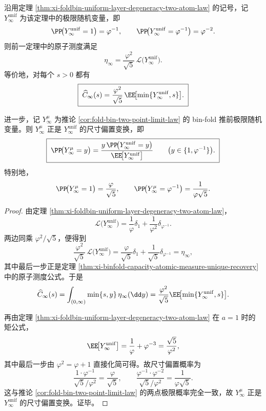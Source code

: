 \begin{theorem}\label{thm:xi-binfold-capacity-size-bias-uniform-law}
沿用定理 \ref{thm:xi-foldbin-uniform-layer-degeneracy-two-atom-law} 的记号，记 \(Y_\infty^{\mathrm{unif}}\) 为该定理中的极限随机变量，即
\[
\PP\!\bigl(Y_\infty^{\mathrm{unif}}=1\bigr)=\varphi^{-1},
\qquad
\PP\!\bigl(Y_\infty^{\mathrm{unif}}=\varphi^{-1}\bigr)=\varphi^{-2}.
\]
则前一定理中的原子测度满足
\[
\boxed{\;
\eta_\infty
=
\frac{\varphi^2}{\sqrt5}\,
\mathcal L\!\bigl(Y_\infty^{\mathrm{unif}}\bigr).\;}
\]
等价地，对每个 \(s>0\) 都有
\[
\boxed{\;
\widehat C_\infty(s)
=
\frac{\varphi^2}{\sqrt5}\,
\EE\!\bigl[\min\{Y_\infty^{\mathrm{unif}},s\}\bigr].\;}
\]

进一步，记 \(Y_\infty^\mu\) 为推论 \ref{cor:fold-bin-two-point-limit-law} 的 bin-fold 推前极限随机变量。则 \(Y_\infty^\mu\) 正是 \(Y_\infty^{\mathrm{unif}}\) 的尺寸偏置变换，即
\[
\boxed{\;
\PP\!\bigl(Y_\infty^\mu=y\bigr)
=
\frac{
y\,\PP\!\bigl(Y_\infty^{\mathrm{unif}}=y\bigr)
}{
\EE\!\bigl[Y_\infty^{\mathrm{unif}}\bigr]
}
\qquad
\bigl(y\in\{1,\varphi^{-1}\}\bigr).\;}
\]
特别地，
\[
\PP\!\bigl(Y_\infty^\mu=1\bigr)=\frac{\varphi}{\sqrt5},
\qquad
\PP\!\bigl(Y_\infty^\mu=\varphi^{-1}\bigr)=\frac{1}{\varphi\sqrt5}.
\]
\end{theorem}
\begin{proof}
由定理 \ref{thm:xi-foldbin-uniform-layer-degeneracy-two-atom-law}，
\[
\mathcal L\!\bigl(Y_\infty^{\mathrm{unif}}\bigr)
=
\frac{1}{\varphi}\delta_1+\frac{1}{\varphi^2}\delta_{\varphi^{-1}}.
\]
两边同乘 \(\varphi^2/\sqrt5\)，便得到
\[
\frac{\varphi^2}{\sqrt5}\,
\mathcal L\!\bigl(Y_\infty^{\mathrm{unif}}\bigr)
=
\frac{\varphi}{\sqrt5}\delta_1+\frac{1}{\sqrt5}\delta_{\varphi^{-1}}
=
\eta_\infty,
\]
其中最后一步正是定理 \ref{thm:xi-binfold-capacity-atomic-measure-unique-recovery} 中的原子测度公式。于是
\[
\widehat C_\infty(s)
=
\int_{(0,\infty)}\min\{s,y\}\,\eta_\infty(\dd y)
=
\frac{\varphi^2}{\sqrt5}
\EE\!\bigl[\min\{Y_\infty^{\mathrm{unif}},s\}\bigr].
\]

再由定理 \ref{thm:xi-foldbin-uniform-layer-degeneracy-two-atom-law} 在 \(a=1\) 时的矩公式，
\[
\EE\!\bigl[Y_\infty^{\mathrm{unif}}\bigr]
=
\frac{1}{\varphi}+\varphi^{-3}
=
\frac{\sqrt5}{\varphi^2},
\]
其中最后一步由 \(\varphi^2=\varphi+1\) 直接化简可得。故尺寸偏置概率为
\[
\frac{1\cdot \varphi^{-1}}{\sqrt5/\varphi^2}=\frac{\varphi}{\sqrt5},
\qquad
\frac{\varphi^{-1}\cdot \varphi^{-2}}{\sqrt5/\varphi^2}
=
\frac{1}{\varphi\sqrt5}.
\]
这与推论 \ref{cor:fold-bin-two-point-limit-law} 的两点极限概率完全一致，故 \(Y_\infty^\mu\) 正是 \(Y_\infty^{\mathrm{unif}}\) 的尺寸偏置变换。证毕。
\end{proof}


